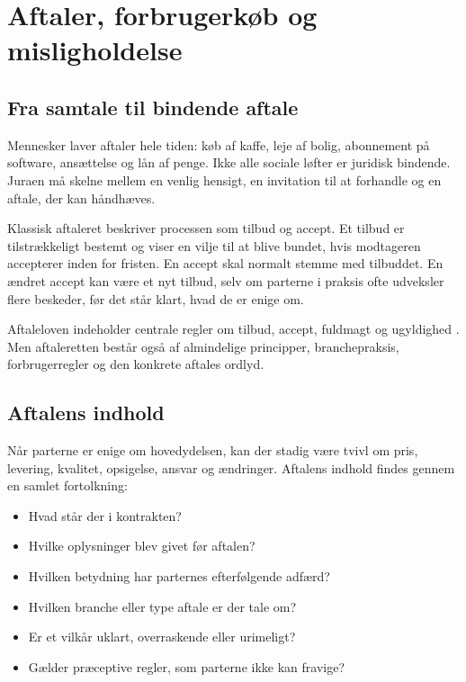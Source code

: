 \chapter{Aftaler, forbrugerkøb og misligholdelse}


\section{Fra samtale til bindende aftale}

Mennesker laver aftaler hele tiden: køb af kaffe, leje af bolig, abonnement på software, ansættelse og lån af penge. Ikke alle sociale løfter er juridisk bindende. Juraen må skelne mellem en venlig hensigt, en invitation til at forhandle og en aftale, der kan håndhæves.

Klassisk aftaleret beskriver processen som tilbud og accept. Et tilbud er tilstrækkeligt bestemt og viser en vilje til at blive bundet, hvis modtageren accepterer inden for fristen. En accept skal normalt stemme med tilbuddet. En ændret accept kan være et nyt tilbud, selv om parterne i praksis ofte udveksler flere beskeder, før det står klart, hvad de er enige om.

Aftaleloven indeholder centrale regler om tilbud, accept, fuldmagt og ugyldighed \citep{aftaleloven}. Men aftaleretten består også af almindelige principper, branchepraksis, forbrugerregler og den konkrete aftales ordlyd.

\section{Aftalens indhold}

Når parterne er enige om hovedydelsen, kan der stadig være tvivl om pris, levering, kvalitet, opsigelse, ansvar og ændringer. Aftalens indhold findes gennem en samlet fortolkning:

\begin{itemize}
  \item Hvad står der i kontrakten?
  \item Hvilke oplysninger blev givet før aftalen?
  \item Hvilken betydning har parternes efterfølgende adfærd?
  \item Hvilken branche eller type aftale er der tale om?
  \item Er et vilkår uklart, overraskende eller urimeligt?
  \item Gælder præceptive regler, som parterne ikke kan fravige?
\end{itemize}

